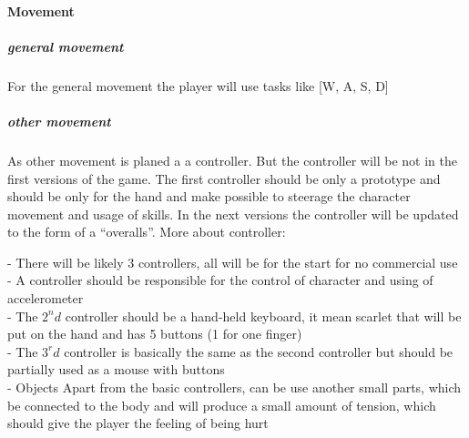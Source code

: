 \documentclass[parskip=full]{scrartcl}
\begin{document}
					\paragraph{Movement} \vspace{-5mm}
						\subparagraph{general movement} \vspace{-5mm}
							\par \begingroup
							\leftskip=2cm
							\noindent
									For the general movement the player will use tasks like [W, A, S, D]
							\par \endgroup
						\subparagraph{other movement} \vspace{-5mm}
							\par \begingroup
							\leftskip=2cm
							\noindent
									As other movement is planed a a controller. But the controller will be not in the first versions of the game. The first controller should be only a prototype and should be only for the hand and make possible to steerage the character movement and usage of skills. In the next versions the controller will be updated to the form of a “overalls”. More about controller:
									\par \begingroup
									\leftskip=2.5cm
									\noindent
											- There will be likely 3 controllers, all will be for the start for no commercial use \\
											- A controller should be responsible for the control of character  and using of accelerometer \\
											- The $2^nd$ controller should be a hand-held keyboard, it mean scarlet that will be put on the hand and has 5 buttons (1 for one finger) \\
											- The $3^rd$ controller is basically the same as the second controller but should be partially used as a mouse with buttons \\
											- Objects Apart from the basic controllers, can be use another small parts, which be connected to the body and will produce a small amount of tension, which should give the player the feeling of being hurt
									\par \endgroup
							\par \endgroup
\end{document}
